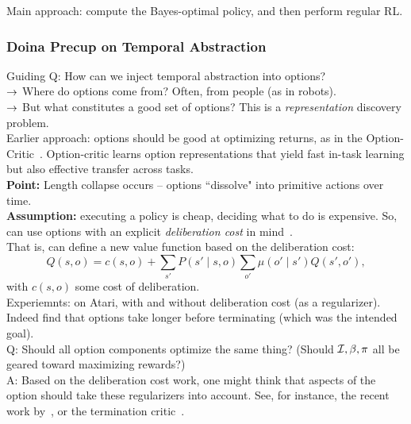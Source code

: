 Main approach: compute the Bayes-optimal policy, and then perform regular RL.



\subsubsection{Doina Precup on Temporal Abstraction}

Guiding Q: How can we inject temporal abstraction into options? \\

$\rightarrow$ Where do options come from? Often, from people (as in robots). \\

$\rightarrow$ But what constitutes a good set of options? This is a {\it representation} discovery problem. \\

Earlier approach: options should be good at optimizing returns, as in the Option-Critic~\cite{bacon2017option}. Option-critic learns option representations that yield fast in-task learning but also effective transfer across tasks. \\

{\bf Point:} Length collapse occurs -- options ``dissolve" into primitive actions over time. \\

{\bf Assumption:} executing a policy is cheap, deciding what to do is expensive. So, can use options with an explicit {\it deliberation cost} in mind~\cite{harb2018waiting}. \\

That is, can define a new value function based on the deliberation cost:
\[
Q(s, o) = c(s,o) + \sum_{s'} P(s' \mid s,o) \sum_{o'} \mu(o' \mid s') Q(s',o'),
\]
with $c(s,o)$ some cost of deliberation. \\


Experiemnts: on Atari, with and without deliberation cost (as a regularizer). Indeed find that options take longer before terminating (which was the intended goal). \\

 Q: Should all option components optimize the same thing? (Should $\mathcal{I}, \beta, \pi$ all be geared toward maximizing rewards?) \\
 
 A: Based on the deliberation cost work, one might think that aspects of the option should take these regularizers into account. See, for instance, the recent work by~\citet{harutyunyan2018learning}, or the termination critic~\cite{harutyunyan2019termination}.\\
 
